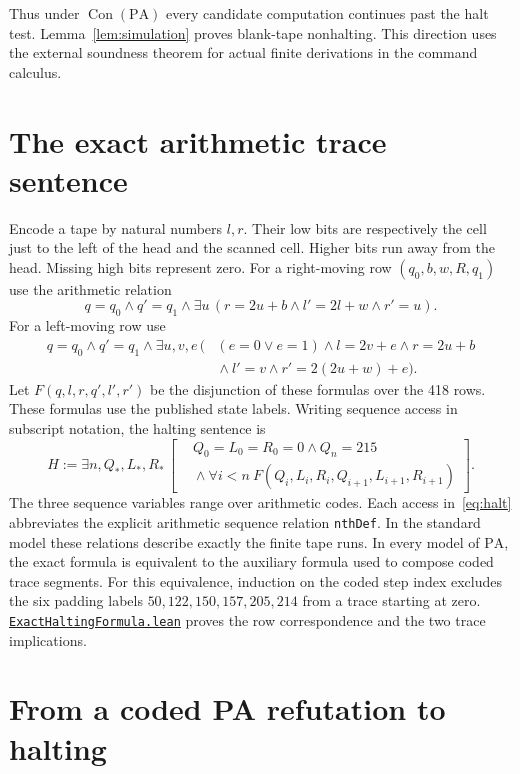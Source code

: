 \documentclass[11pt,letterpaper]{article}
\newcommand{\PA}{\mathrm{PA}}
\newcommand{\Con}{\operatorname{Con}}
\newcommand{\src}[2]{\href{https://github.com/jamesyc/BusyBeaver/blob/main/#1}{\texttt{\nolinkurl{#2}}}}
\begin{document}
Thus under $\Con(\PA)$ every candidate computation continues past
the halt test. Lemma~\ref{lem:simulation} proves blank-tape nonhalting.
This direction uses the external soundness theorem for actual finite
derivations in the command calculus.

\section{The exact arithmetic trace sentence}\label{sec:arith}

Encode a tape by natural numbers $l,r$. Their low bits are respectively
the cell just to the left of the head and the scanned cell. Higher bits
run away from the head. Missing high bits represent zero. For a
right-moving row $(q_0,b,w,R,q_1)$ use the arithmetic relation
\[
  q=q_0\land q'=q_1\land
  \exists u\,(r=2u+b\land l'=2l+w\land r'=u).
\]
For a left-moving row use
\begin{align*}
 q=q_0\land q'=q_1\land\exists u,v,e\,(&
    (e=0\lor e=1)\land l=2v+e\land r=2u+b\\
    &{}\land l'=v\land r'=2(2u+w)+e).
\end{align*}
Let $F(q,l,r,q',l',r')$ be the disjunction of these formulas over
the 418 rows. These formulas use the published state labels. Writing
sequence access in subscript notation, the halting sentence is
\begin{equation}\label{eq:halt}
 H:=\exists n,Q_*,L_*,R_*\,
 \left[
 \begin{aligned}
 &Q_0=L_0=R_0=0\land Q_n=215\\[-2pt]
 &{}\land\forall i<n\ F(Q_i,L_i,R_i,Q_{i+1},L_{i+1},R_{i+1})
 \end{aligned}
 \right].
\end{equation}
The three sequence variables range over arithmetic codes. Each access
in~\eqref{eq:halt} abbreviates the explicit arithmetic sequence
relation \texttt{nthDef}. In the standard model these relations
describe exactly the finite tape runs. In every model of $\PA$, the
exact formula is equivalent to the auxiliary formula used to compose
coded trace segments. For this equivalence, induction on the coded
step index excludes the six padding labels
$50,122,150,157,205,214$ from a trace starting at zero.
\src{M6PA/Model/ExactHaltingFormula.lean}{ExactHaltingFormula.lean}
proves the row correspondence and the two trace implications.

\section{From a coded PA refutation to halting}\label{sec:refutation}
\end{document}
